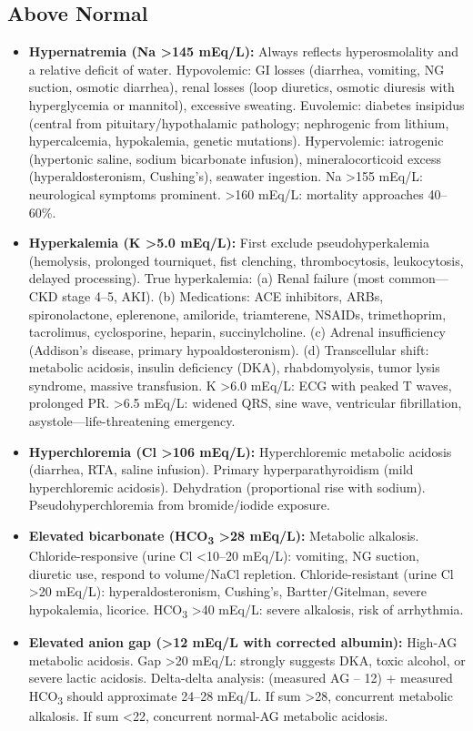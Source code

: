 \subsection*{Above Normal}
\begin{itemize}
  \item \textbf{Hypernatremia (Na >145 mEq/L):} Always reflects hyperosmolality and a relative deficit of water. Hypovolemic: GI losses (diarrhea, vomiting, NG suction, osmotic diarrhea), renal losses (loop diuretics, osmotic diuresis with hyperglycemia or mannitol), excessive sweating. Euvolemic: diabetes insipidus (central from pituitary/hypothalamic pathology; nephrogenic from lithium, hypercalcemia, hypokalemia, genetic mutations). Hypervolemic: iatrogenic (hypertonic saline, sodium bicarbonate infusion), mineralocorticoid excess (hyperaldosteronism, Cushing's), seawater ingestion. Na >155 mEq/L: neurological symptoms prominent. >160 mEq/L: mortality approaches 40--60\%.
  \item \textbf{Hyperkalemia (K >5.0 mEq/L):} First exclude pseudohyperkalemia (hemolysis, prolonged tourniquet, fist clenching, thrombocytosis, leukocytosis, delayed processing). True hyperkalemia: (a) Renal failure (most common---CKD stage 4--5, AKI). (b) Medications: ACE inhibitors, ARBs, spironolactone, eplerenone, amiloride, triamterene, NSAIDs, trimethoprim, tacrolimus, cyclosporine, heparin, succinylcholine. (c) Adrenal insufficiency (Addison's disease, primary hypoaldosteronism). (d) Transcellular shift: metabolic acidosis, insulin deficiency (DKA), rhabdomyolysis, tumor lysis syndrome, massive transfusion. K >6.0 mEq/L: ECG with peaked T waves, prolonged PR. >6.5 mEq/L: widened QRS, sine wave, ventricular fibrillation, asystole---life-threatening emergency.
  \item \textbf{Hyperchloremia (Cl >106 mEq/L):} Hyperchloremic metabolic acidosis (diarrhea, RTA, saline infusion). Primary hyperparathyroidism (mild hyperchloremic acidosis). Dehydration (proportional rise with sodium). Pseudohyperchloremia from bromide/iodide exposure.
  \item \textbf{Elevated bicarbonate (HCO\textsubscript{3} >28 mEq/L):} Metabolic alkalosis. Chloride-responsive (urine Cl <10--20 mEq/L): vomiting, NG suction, diuretic use, respond to volume/NaCl repletion. Chloride-resistant (urine Cl >20 mEq/L): hyperaldosteronism, Cushing's, Bartter/Gitelman, severe hypokalemia, licorice. HCO\textsubscript{3} >40 mEq/L: severe alkalosis, risk of arrhythmia.
  \item \textbf{Elevated anion gap (>12 mEq/L with corrected albumin):} High-AG metabolic acidosis. Gap >20 mEq/L: strongly suggests DKA, toxic alcohol, or severe lactic acidosis. Delta-delta analysis: (measured AG -- 12) + measured HCO\textsubscript{3} should approximate 24--28 mEq/L. If sum >28, concurrent metabolic alkalosis. If sum <22, concurrent normal-AG metabolic acidosis.
\end{itemize}


